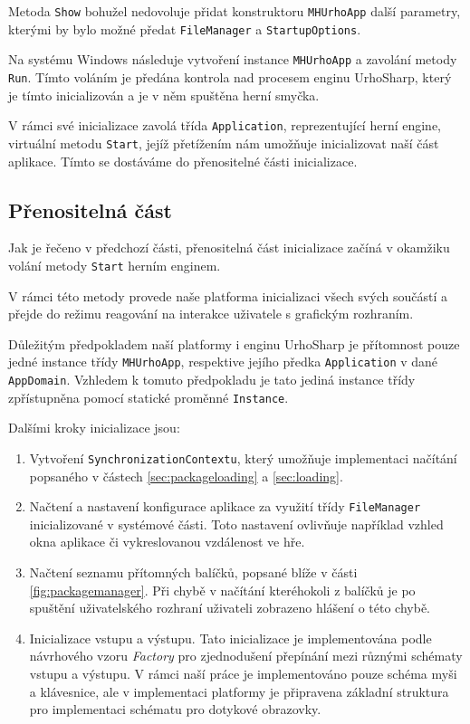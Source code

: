 Metoda \texttt{Show} bohužel nedovoluje přidat konstruktoru \texttt{MHUrhoApp} další parametry, kterými by bylo možné předat \texttt{FileManager} a \texttt{StartupOptions}.

Na systému Windows následuje vytvoření instance \texttt{MHUrhoApp} a zavolání metody \texttt{Run}. Tímto voláním je předána kontrola nad procesem enginu UrhoSharp, který je tímto inicializován a je v něm spuštěna herní smyčka.

V rámci své inicializace zavolá třída \texttt{Application}, reprezentující herní engine, virtuální metodu \texttt{Start}, jejíž přetížením nám umožňuje inicializovat naší část aplikace. Tímto se dostáváme do přenositelné části inicializace.

\subsection{Přenositelná část}

Jak je řečeno v předchozí části, přenositelná část inicializace začíná v okamžiku volání metody \texttt{Start} herním enginem.

V rámci této metody provede naše platforma inicializaci všech svých součástí a přejde do režimu reagování na interakce uživatele s grafickým rozhraním.

Důležitým předpokladem naší platformy i enginu UrhoSharp je přítomnost pouze jedné instance třídy \texttt{MHUrhoApp}, respektive jejího předka \texttt{Application} v dané \texttt{AppDomain}. Vzhledem k tomuto předpokladu je tato jediná instance třídy zpřístupněna pomocí statické proměnné \texttt{Instance}.

Dalšími kroky inicializace jsou:

\begin{enumerate}
	\item Vytvoření \texttt{SynchronizationContextu}, který umožňuje implementaci načítání popsaného v částech \ref{sec:packageloading} a \ref{sec:loading}.
	\item Načtení a nastavení konfigurace aplikace za využití třídy \texttt{FileManager} inicializované v systémové části. Toto nastavení ovlivňuje například vzhled okna aplikace či vykreslovanou vzdálenost ve hře.
	\item Načtení seznamu přítomných balíčků, popsané blíže v části \ref{fig:packagemanager}. Při chybě v načítání kteréhokoli z balíčků je po spuštění uživatelského rozhraní uživateli zobrazeno hlášení o této chybě.
	\item Inicializace vstupu a výstupu. Tato inicializace je implementována podle návrhového vzoru \textit{Factory} pro zjednodušení přepínání mezi různými schématy vstupu a výstupu. V rámci naší práce je implementováno pouze schéma myši a klávesnice, ale v implementaci platformy je připravena základní struktura pro implementaci schématu pro dotykové obrazovky. 
\end{enumerate}

